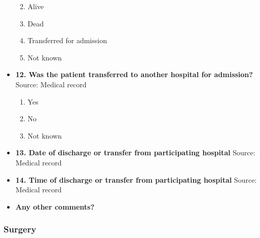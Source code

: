 \documentclass[
]{scrartcl}
\providecommand{\tightlist}{%
  \setlength{\itemsep}{0pt}\setlength{\parskip}{0pt}}\usepackage{longtable,booktabs,array}
\begin{document}
\begin{itemize}
  \begin{enumerate}
  \def\labelenumi{\arabic{enumi}.}
  \tightlist
  \item
    Alive
  \item
    Dead
  \item
    Transferred for admission
  \item
    Not known
  \end{enumerate}
\item
  \textbf{12. Was the patient transferred to another hospital for
  admission?} Source: Medical record

  \begin{enumerate}
  \def\labelenumi{\arabic{enumi}.}
  \tightlist
  \item
    Yes
  \item
    No
  \item
    Not known
  \end{enumerate}
\item
  \textbf{13. Date of discharge or transfer from participating hospital}
  Source: Medical record
\item
  \textbf{14. Time of discharge or transfer from participating hospital}
  Source: Medical record
\item
  \textbf{Any other comments?}
\end{itemize}

\hypertarget{surgery}{%
\subsubsection{Surgery}\label{surgery}}
\end{document}
